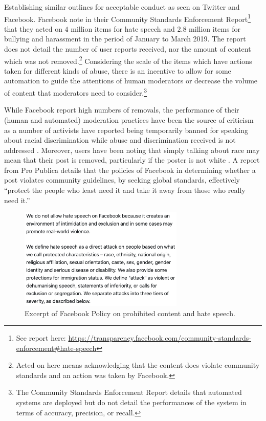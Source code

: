 Establishing similar outlines for acceptable conduct as seen on Twitter and Facebook. Facebook note in their Community Standards Enforcement Report\footnote{See report here: \url{https://transparency.facebook.com/community-standards-enforcement\#hate-speech}} that they acted on $4$ million items for hate speech and $2.8$ million items for bullying and harassment in the period of January to March 2019. The report does not detail the number of user reports received, nor the amount of content which was not removed.\footnote{Acted on here means acknowledging that the content does violate community standards and an action was taken by Facebook.} Considering the scale of the items which have actions taken for different kinds of abuse, there is an incentive to allow for some automation to guide the attentions of human moderators or decrease the volume of content that moderators need to consider.\footnote{The Community Standards Enforcement Report details that automated systems are deployed but do not detail the performances of the system in terms of accuracy, precision, or recall.}

While Facebook report high numbers of removals, the performance of their (human and automated) moderation practices have been the source of criticism as a number of activists have reported being temporarily banned for speaking about racial discrimination while abuse and discrimination received is not addressed \citep{Sharif:2019}.
Moreover, users have been noting that simply talking about race may mean that their post is removed, particularly if the poster is not white \citep{Guynn:2019}. A report from Pro Publica details that the policies of Facebook in determining whether a post violates community guidelines, by seeking global standards, effectively ``protect the people who least need it and take it away from those who really need it.'' \citep{Angwin:2017}

\begin{figure}[!htb]
  \centering
    \includegraphics[width=0.7\textwidth]{Chapter2/Figs/Facebook.png}
    \caption{Excerpt of Facebook Policy on prohibited content and hate speech.}
    \label{fig:fb_pol}
\end{figure}

